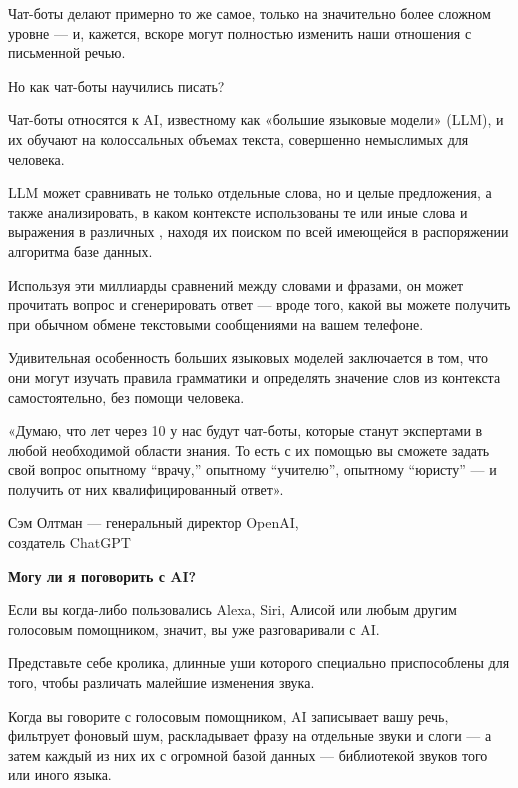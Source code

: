 Чат-боты делают примерно то же самое, только на значительно более сложном уровне — и, кажется, вскоре могут полностью изменить наши отношения с письменной речью.

Но как чат-боты научились писать?

Чат-боты относятся к  AI, известному как «большие языковые модели» (LLM), и их обучают на колоссальных объемах текста, совершенно немыслимых для человека.

LLM может сравнивать не только отдельные слова, но и целые предложения, а также анализировать, в каком контексте использованы те или иные слова и выражения в различных , находя их поиском по всей имеющейся в распоряжении алгоритма базе данных.

Используя эти миллиарды сравнений между словами и фразами, он может прочитать вопрос и сгенерировать ответ — вроде того, какой вы можете получить при обычном обмене текстовыми сообщениями на вашем телефоне.

Удивительная особенность больших языковых моделей заключается в том, что они могут изучать правила грамматики и определять значение слов из контекста самостоятельно, без помощи человека.

\begin{fancyquotes}
    «Думаю, что лет через 10 у нас будут чат-боты, которые станут экспертами в любой необходимой области знания. То есть с их помощью вы сможете задать свой вопрос опытному ``врачу,'' опытному ``учителю'', опытному ``юристу'' --- и получить от них квалифицированный ответ».\\

    \begin{flushright}
        Сэм Олтман — генеральный директор OpenAI,\\
        создатель ChatGPT
    \end{flushright}
\end{fancyquotes}

\textbf{Могу ли я поговорить с AI?}

Если вы когда-либо пользовались Alexa, Siri, Алисой или любым другим голосовым помощником, значит, вы уже разговаривали с AI.

Представьте себе кролика, длинные уши которого специально приспособлены для того, чтобы различать малейшие изменения звука.

Когда вы говорите с голосовым помощником, AI записывает вашу речь, фильтрует фоновый шум, раскладывает фразу на отдельные звуки и слоги --- а затем  каждый из них их с огромной базой данных --- библиотекой звуков того или иного языка.

